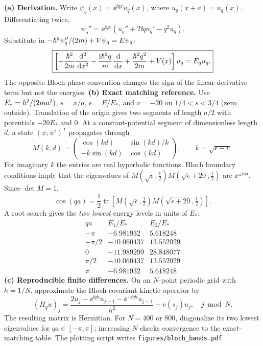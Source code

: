 \textbf{(a) Derivation.}
Write $\psi_q(x)=\ee^{\ii qx}u_q(x)$, where
$u_q(x+a)=u_q(x)$. Differentiating twice,
\[
\psi_q''=\ee^{\ii qx}
(u_q''+2\ii q u_q'-q^2u_q).
\]
Substitute in $-\hbar^2\psi_q''/(2m)+V\psi_q=E\psi_q$:
\begin{equation}
\boxed{\left[-\frac{\hbar^2}{2m}\frac{\,\mathrm d^2}{\,\mathrm d x^2}
-\frac{\mathrm i\hbar^2q}{m}\frac{\,\mathrm d}{\,\mathrm d x}
+\frac{\hbar^2q^2}{2m}+V(x)\right]u_q
=E_q u_q.}
\end{equation}
The opposite Bloch-phase convention changes
the sign of the linear-derivative term but
not the energies.
\textbf{(b) Exact matching reference.}
Use $E_*=\hbar^2/(2ma^2)$,
$s=x/a$, $\epsilon=E/E_*$, and
$v=-20$ on $1/4<s<3/4$ (zero outside).
Translation of the origin gives two
segments of length $a/2$ with potentials
$-20E_*$ and $0$. At a constant-potential
segment of dimensionless length $d$,
a state $(\psi,\psi')^T$ propagates through
\begin{equation}
M(k,d)=
\begin{pmatrix}
\cos(kd)&\sin(kd)/k\\
-k\sin(kd)&\cos(kd)
\end{pmatrix},
\qquad k=\sqrt{\epsilon-v}.
\end{equation}
For imaginary $k$ the entries are real
hyperbolic functions. Bloch boundary
conditions imply that the eigenvalues of
$M(\sqrt\epsilon,\tfrac12)
M(\sqrt{\epsilon+20},\tfrac12)$
are $\ee^{\pm\ii qa}$. Since $\det M=1$,
\begin{equation}
\boxed{\cos(qa)=\frac12\operatorname{tr}
\left[M(\sqrt\epsilon,\tfrac12)
M(\sqrt{\epsilon+20},\tfrac12)\right].}
\end{equation}
A root search gives the \emph{two lowest}
energy levels in units of $E_*$:
\begin{equation}
\begin{array}{c|rr}
qa& E_1/E_*&E_2/E_*\\\hline
-\pi&-6.981932&5.618248\\
-\pi/2&-10.060437&13.552029\\
0&-11.989299&28.848077\\
\pi/2&-10.060437&13.552029\\
\pi&-6.981932&5.618248
\end{array}
\end{equation}
\textbf{(c) Reproducible finite differences.}
On an $N$-point periodic grid with
$h=1/N$, approximate the Bloch-covariant
kinetic operator by
\begin{equation}
(H_qu)_j=\frac{
2u_j-\ee^{\ii qh}u_{j+1}
-\ee^{-\ii qh}u_{j-1}}{h^2}
+v(s_j)u_j,
\quad j\bmod N.
\end{equation}
The resulting matrix is Hermitian.
For $N=400$ or $800$, diagonalize
its two lowest eigenvalues for
$qa\in[-\pi,\pi]$; increasing $N$
checks convergence to the exact-matching
table. The plotting script writes
\texttt{figures/bloch\_bands.pdf}.

